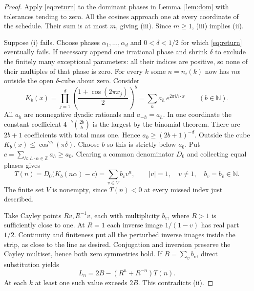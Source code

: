 \documentclass[11pt,letterpaper]{article}
\newcommand{\Z}{\mathbb Z}
\newcommand{\N}{\mathbb N}
\begin{document}
\begin{proof}
Apply \eqref{eq:return} to the dominant phases in Lemma~\ref{lem:dom} with tolerances tending to zero. All the cosines approach one at every coordinate of the schedule. Their sum is at most \(m\), giving (iii). Since \(m\ge1\), (iii) implies (ii).

Suppose (i) fails. Choose phases \(\alpha_1,\ldots,\alpha_d\) and \(0<\delta<1/2\) for which \eqref{eq:return} eventually fails. If necessary append one irrational phase and shrink \(\delta\) to exclude the finitely many exceptional parameters: all their indices are positive, so none of their multiples of that phase is zero. For every \(k\) some \(n=n_i(k)\) now has \(n\alpha\) outside the open \(\delta\)-cube about zero.
Consider
\[
 K_b(x)=\prod_{j=1}^{d}\left(\frac{1+\cos(2\pi x_j)}2\right)^b
       =\sum_h a_h\,e^{2\pi i h\cdot x}\qquad (b\in\N).
\]
All \(a_h\) are nonnegative dyadic rationals and \(a_{-h}=a_h\).
In one coordinate the constant coefficient \(4^{-b}\binom{2b}{b}\) is the largest by the binomial theorem. There are \(2b+1\) coefficients with total mass one. Hence \(a_0\ge(2b+1)^{-d}\).
Outside the cube \(K_b(x)\le\cos^{2b}(\pi\delta)\).
Choose \(b\) so this is strictly below \(a_0\).
Put \(c=\sum_{h:\,h\cdot\alpha\in\Z}a_h\ge a_0\). Clearing a common denominator \(D_0\) and collecting equal phases gives
\[
 T(n)=D_0\bigl(K_b(n\alpha)-c\bigr)
     =\sum_{v\in V} b_v v^n,\qquad |v|=1,\quad v\ne1,\quad b_v=b_{\bar v}\in\N .
\]
The finite set \(V\) is nonempty, since \(T(n)<0\) at every missed index just described.

Take Cayley points \(Rv,R^{-1}v\), each with multiplicity \(b_v\), where \(R>1\) is sufficiently close to one. At \(R=1\) each inverse image \(1/(1-v)\) has real part \(1/2\). Continuity and finiteness put all the perturbed inverse images inside the strip, as close to the line as desired. Conjugation and inversion preserve the Cayley multiset, hence both zero symmetries hold. If \(B=\sum_v b_v\), direct substitution yields
\begin{equation}
 L_n=2B-(R^n+R^{-n})T(n) . \label{eq:counter}
\end{equation}
At each \(k\) at least one such value exceeds \(2B\). This contradicts (ii).
\end{proof}
\end{document}
